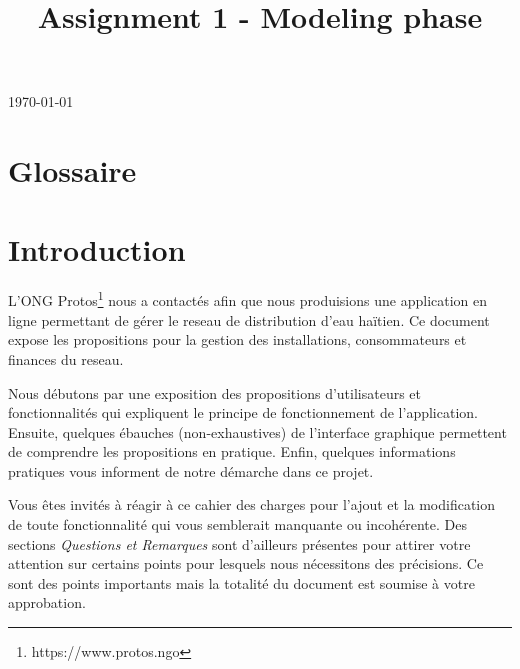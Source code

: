 \documentclass[a4paper, 11pt]{article}
\begin{document}
\begin{titlepage}
\vfill

{\large \today} %



\end{titlepage}
\title{Assignment 1 - Modeling phase}
\newpage

\section{Glossaire}
  \printnoidxglossary
\section{Introduction}

L'ONG Protos\footnote{https://www.protos.ngo} nous a contactés afin que nous produisions une \gls{application} en ligne permettant de gérer le \gls{reseau} de distribution d'eau haïtien. Ce document expose les propositions pour la gestion des installations, \glspl{consommateur} et finances du \gls{reseau}.

Nous débutons par une exposition des propositions d'\glspl{utilisateur} et fonctionnalités qui expliquent le principe de fonctionnement de l'\gls{application}. Ensuite, quelques ébauches (non-exhaustives) de l'\gls{interface} graphique permettent de comprendre les propositions en pratique. Enfin, quelques informations pratiques vous informent de notre démarche dans ce projet.

Vous êtes invités à réagir à ce cahier des charges pour l'ajout et la modification de toute fonctionnalité qui vous semblerait manquante ou incohérente. Des sections \emph{Questions et Remarques} sont d'ailleurs présentes pour attirer votre attention sur certains points pour lesquels nous nécessitons des précisions. Ce sont des points importants mais la totalité du document est soumise à votre approbation.
\end{document}
